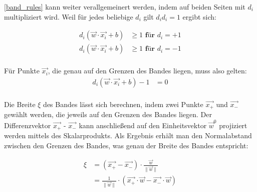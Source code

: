 \documentclass[a4paper,11pt,twoside]{scrreprt}
\begin{document}
\autoref{band_rules} kann weiter verallgemeinert werden, indem auf beiden Seiten mit $d_{i}$ multipliziert wird. Weil für jedes beliebige $d_{i}$ gilt $d_{i} d_{i} = 1$ ergibt sich:

\begin{equation} \label{band_rule1}
    \begin{aligned}
    d_{i} (\vec{w} \cdot \vec{x_{i}} + b) & \geq 1 \textbf{ für $d_{i} = +1$}\\
    d_{i} (\vec{w} \cdot \vec{x_{i}} + b) & \geq 1 \textbf{ für $d_{i} = -1$}\\
    \end{aligned}
\end{equation}

Für Punkte $\vec{x_{i}}$, die genau auf den Grenzen des Bandes liegen, muss also gelten:
\begin{equation} \label{band_rule}
    \begin{aligned}
    d_{i} (\vec{w} \cdot \vec{x_{i}} + b) -1 &= 0\\
    \end{aligned}
\end{equation}

Die Breite $\xi$ des Bandes lässt sich berechnen, indem zwei Punkte $\vec{x_{+}}$ und $\vec{x_{-}}$ gewählt werden, die jeweils auf den Grenzen des Bandes liegen. Der Differenzvektor $\vec{x_{+}}$ - $\vec{x_{-}}$ kann anschließend auf den Einheitsvektor $\vec{w}^{0}$ projiziert werden mittels des Skalarprodukts. Als Ergebnis erhält man den Normalabstand zwischen den Grenzen des Bandes, was genau der Breite des Bandes entspricht:

\begin{equation} \label{band_width}
    \begin{aligned}
    \xi &= (\vec{x_{+}} - \vec{x_{-}}) \cdot \frac{\vec{w}}{\lVert \vec{w} \rVert}\\
    &=  \frac{1}{\lVert \vec{w} \rVert} \cdot (\vec{x_{+}} \cdot \vec{w} - \vec{x_{-}} \cdot \vec{w})
    \end{aligned}
\end{equation}
\end{document}
